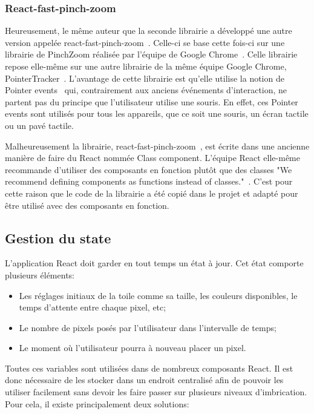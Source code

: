 \subsubsection{React-fast-pinch-zoom}

Heureusement, le même auteur que la seconde librairie a développé une autre version appelée react-fast-pinch-zoom~\cite{react-fast-pinch-zoom}. Celle-ci se base cette fois-ci sur une librairie de PinchZoom réalisée par l'équipe de Google Chrome~\cite{pinch-zoom-googlechromelabs}. Celle librairie repose elle-même sur une autre librairie de la même équipe Google Chrome, PointerTracker~\cite{pointer-tracker}. L'avantage de cette librairie est qu'elle utilise la notion de Pointer events~\cite{pointer-events} qui, contrairement aux anciens événements d'interaction, ne partent pas du principe que l'utilisateur utilise une souris. En effet, ces Pointer events sont utilisés pour tous les appareils, que ce soit une souris, un écran tactile ou un pavé tactile.

Malheureusement la librairie, react-fast-pinch-zoom~\cite{react-fast-pinch-zoom}, est écrite dans une ancienne manière de faire du React nommée Class component. L'équipe React elle-même recommande d'utiliser des composants en fonction plutôt que des classes "We recommend defining components as functions instead of classes."~\cite{react-class-component}. C'est pour cette raison que le code de la librairie a été copié dans le projet et adapté pour être utilisé avec des composants en fonction.

\subsection{Gestion du state}

L'application React doit garder en tout temps un état à jour. Cet état comporte plusieurs éléments:

\begin{itemize}
  \item Les réglages initiaux de la toile comme sa taille, les couleurs disponibles, le temps d'attente entre chaque pixel, etc;
  \item Le nombre de pixels posés par l'utilisateur dans l'intervalle de temps;
  \item Le moment où l'utilisateur pourra à nouveau placer un pixel.
\end{itemize}

Toutes ces variables sont utilisées dans de nombreux composants React. Il est donc nécessaire de les stocker dans un endroit centralisé afin de pouvoir les utiliser facilement sans devoir les faire passer sur plusieurs niveaux d'imbrication. Pour cela, il existe principalement deux solutions:

